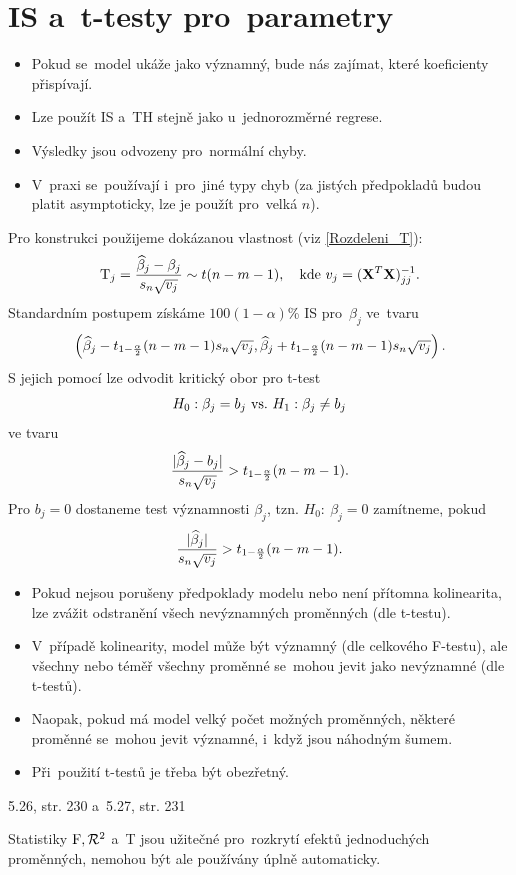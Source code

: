 \section{IS a~t-testy pro~parametry}
\begin{itemize}
	\item Pokud se~model ukáže jako významný, bude nás zajímat, které koeficienty přispívají.
	\item Lze použít IS a~TH stejně jako u~jednorozměrné regrese.
	\item Výsledky jsou odvozeny pro~normální chyby.
	\item V~praxi se~používají i~pro~jiné typy chyb (za jistých předpokladů budou platit asymptoticky, lze je použít pro~velká $n$).
\end{itemize}
Pro konstrukci použijeme dokázanou vlastnost (viz \eqref{Rozdeleni_T}):
 $$ \mathrm{T}_j = \frac{\widehat{\beta}_j-\beta_j}{s_n\sqrt{v_j}}\sim t(n-m-1),\quad\text{kde } v_j = (\mathbf{X}^T\mathbf{X})_{jj}^{-1}. $$
Standardním postupem získáme $100(1-\alpha)$\% IS pro~$\beta_j$ ve~tvaru
 $$ \left(\widehat{\beta}_j-t_{1-\frac{\alpha}{2}}(n-m-1)s_n\sqrt{v_j},\widehat{\beta}_j+t_{1-\frac{\alpha}{2}}(n-m-1)s_n\sqrt{v_j} \right).$$
S jejich pomocí lze odvodit kritický obor pro t-test
 $$ H_0: \beta_j = b_j ~\text{vs.}~ H_1: \beta_j\neq b_j $$
ve tvaru
 $$ \frac{|\widehat{\beta}_j-b_j|}{s_n\sqrt{v_j}}>t_{1-\frac{\alpha}{2}}(n-m-1).$$
Pro $b_j = 0$ dostaneme test významnosti $\beta_j$, tzn. $H_0:~\beta_j = 0$ zamítneme, pokud
 $$ \frac{|\widehat{\beta}_j|}{s_n\sqrt{v_j}}>t_{1-\frac{\alpha}{2}}(n-m-1). $$
\begin{remark}
	\begin{itemize}
		\item Pokud nejsou porušeny předpoklady modelu nebo není přítomna kolinearita, lze zvážit odstranění všech nevýznamných proměnných (dle t-testu).
		\item V~případě kolinearity, model může být významný (dle celkového F-testu), ale všechny nebo téměř všechny proměnné se~mohou jevit jako nevýznamné (dle t-testů).
		\item Naopak, pokud má model velký počet možných proměnných, některé proměnné se~mohou jevit významné, i~když jsou náhodným šumem.
		\item Při~použití t-testů je třeba být obezřetný.
	\end{itemize}
\end{remark}
\begin{example}
	5.26, str. 230 a~5.27, str. 231
\end{example}
\begin{remark}
	Statistiky $\mathrm{F},\mathcal{R}^2$ a~T jsou užitečné pro~rozkrytí efektů jednoduchých proměnných, nemohou být ale používány úplně automaticky.
\end{remark}

